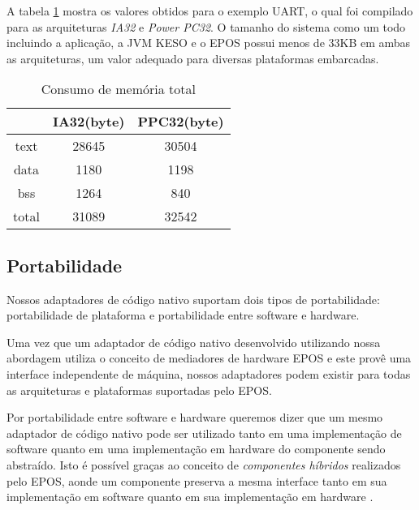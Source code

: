 A tabela \ref{tab:space_overhead} mostra os valores obtidos para o exemplo UART,
o qual foi compilado para as arquiteturas \emph{IA32} e \emph{Power PC32}.
O tamanho do sistema como um todo incluindo a aplicação, a JVM KESO e o EPOS
possui menos de 33KB em ambas as arquiteturas, um valor adequado para diversas
plataformas embarcadas.

\begin{table}[t]
\begin{center}
\begin{tabular}{|c|c|c|}
\hline
\textbf{} & \textbf{IA32(byte)} & \textbf{PPC32(byte)} \\
\hline
text & 28645 & 30504 \\
\hline
data & 1180 & 1198 \\
\hline
bss & 1264 & 840 \\
\hline
total & 31089 & 32542 \\
\hline
\end{tabular}
\caption{Consumo de memória total}
\label{tab:space_overhead}
\end{center}
\end{table}

\subsection{Portabilidade}
Nossos adaptadores de código nativo suportam dois tipos de portabilidade:
portabilidade de plataforma e portabilidade entre software e hardware.

Uma vez que um adaptador de código nativo desenvolvido utilizando nossa 
abordagem utiliza o conceito de mediadores de hardware EPOS e este provê uma
interface independente de máquina, nossos adaptadores podem existir para todas 
as arquiteturas e plataformas suportadas pelo EPOS.

Por portabilidade entre software e hardware queremos dizer que um mesmo 
adaptador de código nativo pode ser utilizado tanto em uma implementação de
software quanto em uma implementação em hardware do componente sendo abstraído.
Isto é possível graças ao conceito de \emph{componentes híbridos} realizados
pelo EPOS, aonde um componente preserva a mesma interface tanto em sua 
implementação em software quanto em sua implementação em 
hardware \cite{Marcondes:IESS:2009}.


